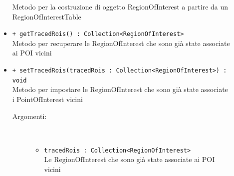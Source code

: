 \documentclass[../DefinizioneDiProdotto.tex]{subfiles}
\begin{document}
\begin{description}
\begin{itemize}
		Metodo per la costruzione di oggetto RegionOfInterest a partire da un RegionOfInterestTable
		\item \texttt{+ getTracedRois() : Collection<RegionOfInterest>}\\
		Metodo per recuperare le RegionOfInterest che sono già state associate ai POI vicini
		\item \texttt{+ setTracedRois(tracedRois : Collection<RegionOfInterest>) : void}\\
		Metodo per impostare le RegionOfInterest che sono già state associate i PointOfInterest vicini
		\begin{description}
			\item[Argomenti:] \
			\begin{itemize}
				\item \texttt{tracedRois : Collection<RegionOfInterest>}\\
				Le RegionOfInterest che sono già state associate ai POI vicini\end{itemize}
		\end{description}
	\end{itemize}
\end{description}
\end{document}
